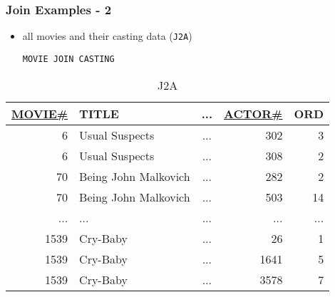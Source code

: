 \documentclass[dvipsnames]{beamer}
\theoremstyle{plain}
\begin{document}
\begin{frame}[fragile]
  \frametitle{Join Examples - 2}

  \begin{itemize}
    \item all movies and their casting data (\texttt{J2A})
    \begin{lstlisting}
MOVIE JOIN CASTING
    \end{lstlisting}
  \end{itemize}

  \vspace{-10pt}
  \begin{tiny}
  \begin{table}
    \caption{J2A}
    \begin{tabular}{|r|l|c|r|r|}\hline
\underline{MOVIE\#} & TITLE & ... & \underline{ACTOR\#} & ORD\\[2pt]\hline\hline
   6 & Usual Suspects       & ... &                 302 &   3\\\hline
   6 & Usual Suspects       & ... &                 308 &   2\\\hline
  70 & Being John Malkovich & ... &                 282 &   2\\\hline
  70 & Being John Malkovich & ... &                 503 &  14\\\hline
 ... & ...                  & ... &                 ... & ...\\\hline
1539 & Cry-Baby             & ... &                  26 &   1\\\hline
1539 & Cry-Baby             & ... &                1641 &   5\\\hline
1539 & Cry-Baby             & ... &                3578 &   7\\\hline
    \end{tabular}
  \end{table}
  \end{tiny}
\end{frame}
\end{document}
